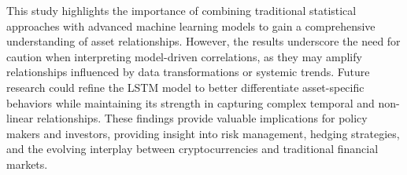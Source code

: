 \documentclass{article}
\begin{document}
This study highlights the importance of combining traditional statistical approaches with advanced machine learning models to gain a comprehensive understanding of asset relationships. However, the results underscore the need for caution when interpreting model-driven correlations, as they may amplify relationships influenced by data transformations or systemic trends. Future research could refine the LSTM model to better differentiate asset-specific behaviors while maintaining its strength in capturing complex temporal and non-linear relationships. These findings provide valuable implications for policy makers and investors, providing insight into risk management, hedging strategies, and the evolving interplay between cryptocurrencies and traditional financial markets.



\newpage


\end{document}
